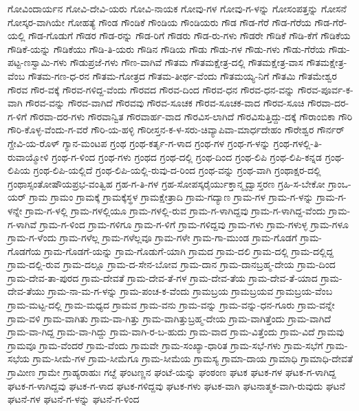ಗೋವಿಂದಾರ್ಯನ
ಗೋವಿ-ದೇವಿ-ಯರು
ಗೋವಿ-ನಾಯಕ
ಗೋವು-ಗಳ
ಗೋವು-ಗ-ಳನ್ನು
ಗೋಸಂಪತ್ತನ್ನು
ಗೋಸನೆ
ಗೋಸ್ಕರ-ವಾಗಿಯೇ
ಗೋಹತ್ಯೆ
ಗೌಂಡ
ಗೌಂಡಿಕೆ
ಗೌಂಡಿಯ
ಗೌಂಡಿಯರು
ಗೌಡ
ಗೌಡ-ಗೆರೆ
ಗೌಡ-ಗೆರೆಯ
ಗೌಡ-ಗೆರೆ-ಯಲ್ಲಿ
ಗೌಡ-ಗೊಡುಗೆ
ಗೌಡರ
ಗೌಡ-ರನ್ನು
ಗೌಡ-ರಿಗೆ
ಗೌಡರು
ಗೌಡ-ರು-ಗಳು
ಗೌಡರೇ
ಗೌಡಿಕೆ
ಗೌಡಿ-ಕೆಗೆ
ಗೌಡಿಕೆಯ
ಗೌಡಿಕೆ-ಯನ್ನು
ಗೌಡಿಕೆಯು
ಗೌಡಿ-ತಿ-ಯರು
ಗೌಡಿನ
ಗೌಡಿಯ
ಗೌಡು
ಗೌಡು-ಗಳ
ಗೌಡು-ಗಳು
ಗೌಡು-ಗೆರೆಯ
ಗೌಡು-ಪಟ್ಟ-ಣಸ್ವಾಮಿ-ಗಳು
ಗೌಡುಪ್ರಜೆ-ಗಳು
ಗೌಣ-ವಾಗಿವೆ
ಗೌತಮ
ಗೌತಮಕ್ಷೇತ್ರ-ದಲ್ಲಿ
ಗೌತಮಕ್ಷೇತ್ರ-ವಾಸ
ಗೌತಮಕ್ಷೇತ್ರ-ವೆಂಬ
ಗೌತಮ-ಗಣ-ಧ-ರನ
ಗೌತಮ-ಗೋತ್ರದ
ಗೌತಮ-ತೀರ್ಥ-ವೆಂದು
ಗೌತಮಯ್ಯ-ನಿಗೆ
ಗೌತಮಿ
ಗೌತಮೇಶ್ವರ
ಗೌರವ
ಗೌರ-ವಕ್ಕೆ
ಗೌರವ-ಗಳಿದ್ದ-ವೆಂದು
ಗೌರವದ
ಗೌರವ-ದಿಂದ
ಗೌರವ-ಧನ
ಗೌರವ-ಧನ-ವನ್ನು
ಗೌರವ-ಪೂರ್ವ-ಕ-ವಾಗಿ
ಗೌರವ-ವನ್ನು
ಗೌರವ-ವಾಗಿದೆ
ಗೌರವವು
ಗೌರವ-ಸೂಚಕ
ಗೌರವ-ಸೂಚಕ-ವಾದ
ಗೌರವ-ಸೂಚಿ
ಗೌರವಾ-ದರ-ಗ-ಳಿಗೆ
ಗೌರವಾ-ದರ-ಗಳು
ಗೌರವಾನ್ವಿತ
ಗೌರವಾರ್ಹ-ವಾದ
ಗೌರವಿಸ-ಲಾಗಿದೆ
ಗೌರವಿಸುತ್ತಿದ್ದು-ದಕ್ಕೆ
ಗೌರಾಂಬಿಕಾ
ಗೌರಿ
ಗೌರಿ-ಕೊಳ್ಳ-ವೆಂದು-ಗ-ವರೆ
ಗೌರಿ-ಯ-ಹಳ್ಳಿ
ಗೌರೀಸ್ತನ-ಕ-ಳ-ಸರು-ಚಿವ್ಯಾಪಿವಾ-ಮಾರ್ಧದೇಹಂ
ಗೌರೇಶ್ವರ
ಗೌರ್ನರ್
ಗ್ದೇವಿ-ಯ-ರೊಳ್
ಗ್ಯಾನ-ಮಂಟಪ
ಗ್ರಂಥ
ಗ್ರಂಥ-ಕರ್ತೃ-ಗ-ಳಾದ
ಗ್ರಂಥ-ಗಳ
ಗ್ರಂಥ-ಗ-ಳನ್ನು
ಗ್ರಂಥ-ಗಳಲ್ಲಿ-ತಿ-ರುವಾಯ್ಮೋಳಿ
ಗ್ರಂಥ-ಗ-ಳಿಂದ
ಗ್ರಂಥ-ಗಳು
ಗ್ರಂಥದ
ಗ್ರಂಥ-ದಲ್ಲಿ
ಗ್ರಂಥ-ದಿಂದ
ಗ್ರಂಥ-ಲಿಪಿ
ಗ್ರಂಥ-ಲಿಪಿ-ಕನ್ನಡ
ಗ್ರಂಥ-ಲಿಪಿಯ
ಗ್ರಂಥ-ಲಿಪಿ-ಯಲ್ಲಿದೆ
ಗ್ರಂಥ-ಲಿಪಿ-ಯಲ್ಲಿ-ರುವು-ದ-ರಿಂದ
ಗ್ರಂಥ-ವನ್ನು
ಗ್ರಂಥ-ವಾಗಿ
ಗ್ರಂಥಾಕ್ಷರ-ದಲ್ಲಿ
ಗ್ರಂಥಾಸ್ಸಂತೋಷೌಯಪ್ರಭ-ವಂತ್ವಿಹ
ಗ್ರಹ-ಗ-ತಿ-ಗಳ
ಗ್ರಹ-ಸೋಪಸ್ಕರೈರ್ಯುಕ್ತಾನ್ಮೃದ್ವಾಸ್ತರಣ
ಗ್ರಹಿ-ಸ-ಬೇಕೋ
ಗ್ರಾಂಒ-ಯರ್
ಗ್ರಾಮ
ಗ್ರಾಮಂ
ಗ್ರಾಮಕ್ಕೆ
ಗ್ರಾಮಕ್ಕೆಸ್ಥಳ
ಗ್ರಾಮಕ್ಷೇತ್ರಾದಿ
ಗ್ರಾಮ-ಗದ್ಯಾಣ
ಗ್ರಾಮ-ಗಳ
ಗ್ರಾಮ-ಗ-ಳನ್ನು
ಗ್ರಾಮ-ಗ-ಳನ್ನೇ
ಗ್ರಾಮ-ಗ-ಳಲ್ಲಿ
ಗ್ರಾಮ-ಗಳಲ್ಲಿಯೂ
ಗ್ರಾಮ-ಗಳಲ್ಲಿ-ರುವ
ಗ್ರಾಮ-ಗ-ಳಾಗಿದ್ದವು
ಗ್ರಾಮ-ಗ-ಳಾಗಿದ್ದ-ವೆಂದು
ಗ್ರಾಮ-ಗ-ಳಾಗಿವೆ
ಗ್ರಾಮ-ಗ-ಳಿಂದ
ಗ್ರಾಮ-ಗಳಿಗೂ
ಗ್ರಾಮ-ಗ-ಳಿಗೆ
ಗ್ರಾಮ-ಗಳಿದ್ದವು
ಗ್ರಾಮ-ಗಳು
ಗ್ರಾಮ-ಗಳುಳ್ಳ
ಗ್ರಾಮ-ಗಳೂ
ಗ್ರಾಮ-ಗ-ಳೆಂದು
ಗ್ರಾಮ-ಗಳೆಲ್ಲ
ಗ್ರಾಮ-ಗಳೆಲ್ಲವೂ
ಗ್ರಾಮ-ಗಳೇ
ಗ್ರಾಮ-ಗಾ-ಮುಂಡ
ಗ್ರಾಮ-ಗೊಡಗೆ
ಗ್ರಾಮ-ಗೊಡಗೆಯ
ಗ್ರಾಮ-ಗೊಡಗೆ-ಯನ್ನು
ಗ್ರಾಮ-ಗೊಡುಗೆ-ಯಾಗಿ
ಗ್ರಾಮದ
ಗ್ರಾಮ-ದಲಿ
ಗ್ರಾಮ-ದಲ್ಲಿ
ಗ್ರಾಮ-ದಲ್ಲಿದ್ದ
ಗ್ರಾಮ-ದಲ್ಲಿ-ರುವ
ಗ್ರಾಮ-ದಲ್ಲೂ
ಗ್ರಾಮ-ದ-ಸೇನ-ಬೋವ
ಗ್ರಾಮ-ದಾನ
ಗ್ರಾಮ-ದಾನಬ್ರಹ್ಮ-ದೇಯ
ಗ್ರಾಮ-ದಿಂದ
ಗ್ರಾಮ-ದೇವ-ತಾ-ಪುರದ
ಗ್ರಾಮ-ದೇವತೆ
ಗ್ರಾಮ-ದೇವ-ತೆ-ಗಳ
ಗ್ರಾಮ-ದೇವ-ತೆಯ
ಗ್ರಾಮ-ದೇವ-ತೆ-ಯಾದ
ಗ್ರಾಮ-ದೇವ-ತೆಯು
ಗ್ರಾಮ-ನಾ-ಮ-ಗ-ಳನ್ನು
ಗ್ರಾಮ-ಪಂಚ-ಕ-ವೆಂದು
ಗ್ರಾಮಬ್ರಯ
ಗ್ರಾಮಬ್ರಯವ
ಗ್ರಾಮಬ್ರಯ-ವೆಂಬ
ಗ್ರಾಮ-ಮಟ್ಟ-ದಲ್ಲಿ
ಗ್ರಾಮ-ಮಧ್ಯದ
ಗ್ರಾಮವ
ಗ್ರಾಮ-ವನು
ಗ್ರಾಮ-ವನ್ನು
ಗ್ರಾಮ-ವನ್ನು-ಧನ-ಗೂರು
ಗ್ರಾಮ-ವನ್ನೇ
ಗ್ರಾಮ-ವಳಿ
ಗ್ರಾಮ-ವಾಗಿತು
ಗ್ರಾಮ-ವಾ-ಗಿತ್ತು
ಗ್ರಾಮ-ವಾಗಿತ್ತುಬ್ರಹ್ಮ-ದೇಯ
ಗ್ರಾಮ-ವಾಗಿತ್ತೆಂದು
ಗ್ರಾಮ-ವಾಗಿದೆ
ಗ್ರಾಮ-ವಾ-ಗಿದ್ದ
ಗ್ರಾಮ-ವಾ-ಗಿದ್ದು
ಗ್ರಾಮ-ವಾಗಿ-ರ-ಬ-ಹುದು
ಗ್ರಾಮ-ವಾದ
ಗ್ರಾಮ-ವಿತ್ತೆಂದು
ಗ್ರಾಮ-ವಿದೆ
ಗ್ರಾಮವು
ಗ್ರಾಮವೂ
ಗ್ರಾಮ-ವೆಂದರೆ
ಗ್ರಾಮ-ವೆಂದು
ಗ್ರಾಮವೇ
ಗ್ರಾಮ-ಸಂಖ್ಯಾ-ಧಾರಿತ
ಗ್ರಾಮ-ಸಭೆ-ಗಳು
ಗ್ರಾಮ-ಸಭೆಗೆ
ಗ್ರಾಮ-ಸಭೆಯ
ಗ್ರಾಮ-ಸೀಮೆ-ಗಳ
ಗ್ರಾಮ-ಸೀಮೆಗೂ
ಗ್ರಾಮ-ಸೀಮೆಯ
ಗ್ರಾಮಸ್ಯ
ಗ್ರಾಮಾ-ದಾಯ
ಗ್ರಾಮಾಧಿ
ಗ್ರಾಮಾಧಿ-ದೇವತೆ
ಗ್ರಾಮೀಣ
ಗ್ರಾಮೇ
ಗ್ರಾಹ್ಯರಾಹುಃ
ಗೞ್ದೆ
ಘಂಟಣ್ಣನ
ಘಂಟೆ-ಯನ್ನು
ಘಂಠಂಣ
ಘಟಕ
ಘಟಕ-ಗಳ
ಘಟಕ-ಗ-ಳಾಗಿದ್ದ
ಘಟಕ-ಗ-ಳಾಗಿದ್ದವು
ಘಟಕ-ಗ-ಳಾದ
ಘಟಕ-ಗಳಿದ್ದವು
ಘಟಕ-ಗಳು
ಘಟಕ-ವಾಗಿ
ಘಟನಾತ್ಮಕ-ವಾಗಿ-ರುವುದು
ಘಟನೆ
ಘಟನೆ-ಗಳ
ಘಟನೆ-ಗ-ಳನ್ನು
ಘಟನೆ-ಗ-ಳಿಂದ
